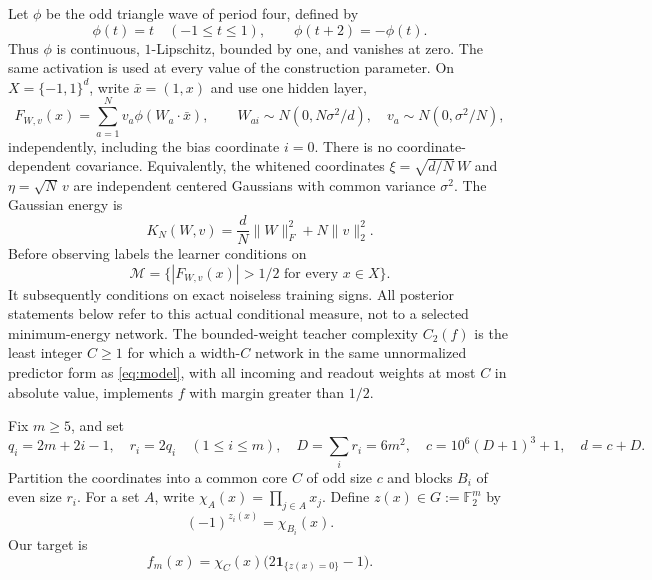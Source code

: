\documentclass[11pt]{article}
\newcommand{\F}{\mathbb F}
\newcommand{\one}{\mathbf 1}
\begin{document}
Let $\phi$ be the odd triangle wave of period four, defined by
\[
 \phi(t)=t\quad(-1\le t\le1),\qquad
 \phi(t+2)=-\phi(t).
\]
Thus $\phi$ is continuous, $1$-Lipschitz, bounded by one, and vanishes
at zero. The same activation is used at every value of the construction
parameter. On $X=\{-1,1\}^d$, write $\bar x=(1,x)$ and use one hidden
layer,
\begin{equation}\label{eq:model}
 F_{W,v}(x)=\sum_{a=1}^N v_a\phi(W_a\cdot\bar x),\qquad
 W_{ai}\sim N(0,N\sigma^2/d),\quad
 v_a\sim N(0,\sigma^2/N),
\end{equation}
independently, including the bias coordinate $i=0$. There is no
coordinate-dependent covariance. Equivalently, the whitened coordinates
$\xi=\sqrt{d/N}\,W$ and $\eta=\sqrt N\,v$ are independent centered
Gaussians with common variance $\sigma^2$. The Gaussian energy is
\begin{equation}\label{eq:energy}
 K_N(W,v)=\frac dN\|W\|_F^2+N\|v\|_2^2.
\end{equation}
Before observing labels the learner conditions on
\begin{equation}\label{eq:globalmargin}
 \mathcal M=\{|F_{W,v}(x)|>1/2\text{ for every }x\in X\}.
\end{equation}
It subsequently conditions on exact noiseless training signs. All
posterior statements below refer to this actual conditional measure,
not to a selected minimum-energy network.
The bounded-weight teacher complexity $C_2(f)$ is the least integer
$C\ge1$ for which a width-$C$ network in the same unnormalized predictor
form as \eqref{eq:model}, with all incoming and readout weights at most
$C$ in absolute value, implements $f$ with margin greater than $1/2$.

Fix $m\ge5$, and set
\begin{equation}\label{eq:dimensions}
 q_i=2m+2i-1,\quad r_i=2q_i\quad(1\le i\le m),\quad
 D=\sum_i r_i=6m^2,\quad
 c=10^6(D+1)^3+1,\quad d=c+D.
\end{equation}
Partition the coordinates into a common core $C$ of odd size $c$ and
blocks $B_i$ of even size $r_i$. For a set $A$, write
$\chi_A(x)=\prod_{j\in A}x_j$. Define $z(x)\in G:=\F_2^m$ by
\[
 (-1)^{z_i(x)}=\chi_{B_i}(x).
\]
Our target is
\begin{equation}\label{eq:target}
 f_m(x)=\chi_C(x)\bigl(2\one_{\{z(x)=0\}}-1\bigr).
\end{equation}
\end{document}
